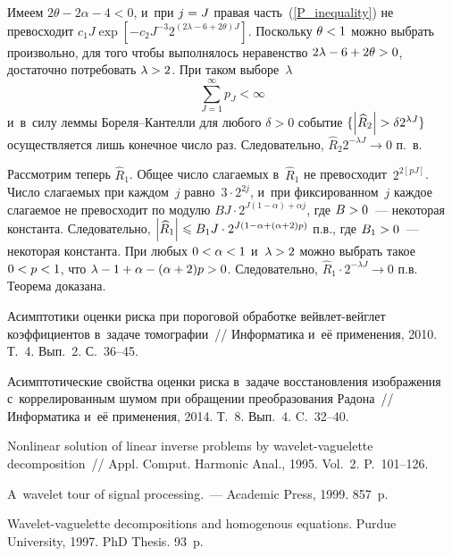\begin{multicols}{2}
Имеем $2\theta-2\alpha-4<0$, и~при $j\hm=J$ правая часть~(\ref{P_inequality}) не 
превосходит $c_1 J\exp\left[-c_2J^{-3} 2^{(2\lambda-6+2\theta)J}\right]$. 
Поскольку $\theta\hm<1$ можно выбрать произвольно, для того чтобы выполнялось 
неравенство $2\lambda\hm-6\hm+2\theta\hm>0$, достаточно потребовать $\lambda\hm>2$. 
При таком выборе~$\lambda$
\begin{equation*}
\sum\limits_{J=1}^{\infty}p_J<\infty
\end{equation*}
и~в~силу леммы Бо\-ре\-ля--Кан\-тел\-ли для любого $\delta>0$ событие $\{\left\vert\widehat{R}_2\right\vert>\delta2^{\lambda J}\}$ осуществляется лишь конечное число раз. Следовательно, $\widehat{R}_2 2^{-\lambda J}\rightarrow 0$ п.~в.

Рассмотрим теперь $\widehat{R}_1$. Общее число сла\-га\-емых в~$\widehat{R}_1$ не 
превосходит~$2^{2[pJ]}$. Число слагаемых при каж\-дом~$j$ равно~$3\cdot2^{2j}$, 
и~при фиксированном~$j$ каждое слагаемое не превосходит по 
модулю $B J\cdot2^{J(1-\alpha)+\alpha j}$, где $B\hm>0$~--- 
некоторая константа. Следовательно, 
$\abs{\widehat{R}_1}\hm\leqslant B_1J\cdot 2^{J(1-\alpha+(\alpha+2)p)}$ п.в., 
где $B_1\hm>0$~--- некоторая константа. При любых $0\hm<\alpha\hm<1$ 
и~$\lambda\hm>2$ можно выбрать такое $0\hm<p\hm<1$, что 
$\lambda\hm-1\hm+\alpha\hm-(\alpha\hm+2)p\hm>0$. Следовательно, 
$\widehat{R}_1 \cdot 2^{-\lambda J}\rightarrow 0$ п.в. Теорема доказана.

{\small\frenchspacing
 {%
 \begin{thebibliography}{99}

Асимптотики оценки риска при пороговой обработке вей\-влет-вейг\-лет 
коэффициентов в~задаче
томографии~// Информатика и~её применения, 2010. Т.~4. Вып.~2. С.~36--45.

Асимптотические свойства оценки риска в~задаче восстановления изображения 
с~коррелированным шумом при обращении преобразования Радона~// 
Информатика и~её применения, 2014. Т.~8. Вып.~4. C.~32--40.

 Nonlinear solution of linear inverse problems 
by wavelet-vaguelette decomposition~// Appl. Comput. Harmonic Anal., 1995. 
Vol.~2. P.~101--126.

 A~wavelet tour of signal processing.~--- Academic Press, 1999. 857~p.

 Wavelet-vaguelette decompositions and homogenous equations. 
Purdue University, 1997. PhD Thesis. 93~p.


\end{thebibliography}}}
\end{multicols}
